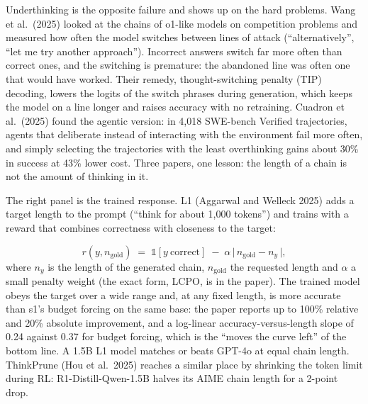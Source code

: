 \documentclass[11pt,letterpaper]{article}
\newenvironment{formulas}{\begin{tcolorbox}[formulabox]}{\end{tcolorbox}}
\begin{document}
Underthinking is the opposite failure and shows up on the hard problems. Wang et al.\ (2025) looked at the chains of o1-like models on competition problems and measured how often the model switches between lines of attack (``alternatively'', ``let me try another approach''). Incorrect answers switch far more often than correct ones, and the switching is premature: the abandoned line was often one that would have worked. Their remedy, thought-switching penalty (TIP) decoding, lowers the logits of the switch phrases during generation, which keeps the model on a line longer and raises accuracy with no retraining. Cuadron et al.\ (2025) found the agentic version: in 4,018 SWE-bench Verified trajectories, agents that deliberate instead of interacting with the environment fail more often, and simply selecting the trajectories with the least overthinking gains about 30\% in success at 43\% lower cost. Three papers, one lesson: the length of a chain is not the amount of thinking in it.

The right panel is the trained response. L1 (Aggarwal and Welleck 2025) adds a target length to the prompt (``think for about 1,000 tokens'') and trains with a reward that combines correctness with closeness to the target:
\begin{formulas}
\[
r(y, n_{\text{gold}})\;=\;\mathbb{1}[y\ \text{correct}]\;-\;\alpha\,\bigl|\,n_{\text{gold}}-n_{y}\,\bigr|,
\]
where $n_y$ is the length of the generated chain, $n_{\text{gold}}$ the requested length and $\alpha$ a small penalty weight (the exact form, LCPO, is in the paper). The trained model obeys the target over a wide range and, at any fixed length, is more accurate than s1's budget forcing on the same base: the paper reports up to 100\% relative and 20\% absolute improvement, and a log-linear accuracy-versus-length slope of 0.24 against 0.37 for budget forcing, which is the ``moves the curve left'' of the bottom line. A 1.5B L1 model matches or beats GPT-4o at equal chain length. ThinkPrune (Hou et al.\ 2025) reaches a similar place by shrinking the token limit during RL: R1-Distill-Qwen-1.5B halves its AIME chain length for a 2-point drop.
\end{formulas}
\end{document}

